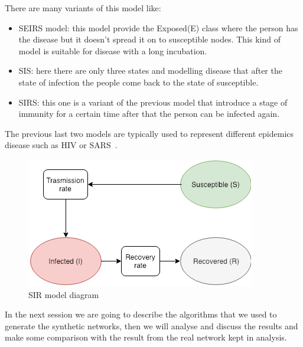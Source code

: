     There are many variants of this model like:
    \begin{itemize}
      \item SEIRS model: this model provide the Exposed(E) class where the person has the disease but it doesn't spread it on to susceptible nodes.
      This kind of model is suitable for disease with a long incubation.
      \item SIS: here there are only three states and modelling disease that after the state of infection the people come back to the state of susceptible.
      \item SIRS: this one is a variant of the previous model that introduce a stage of immunity for a certain time after that the person can be infected again.
    \end{itemize}
    The previous last two models are typically used to represent different epidemics disease such as HIV or SARS~\cite{hethcote2000mathematics}.
    
    \begin{figure}[t]
        \centering
        \includegraphics[width=\linewidth]{Figure/sir.png}
        \caption{SIR model diagram}
        \label{fig:SIRDiagram}
    \end{figure}
    
    In the next session we are going to describe the algorithms that we used to generate the synthetic networks, then we will analyse and discuss the results and make some comparison with the result from the real network kept in analysis.